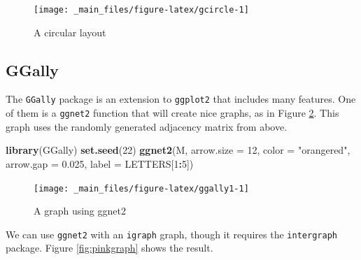 \documentclass[
]{book}
\newenvironment{Shaded}{\begin{snugshade}}{\end{snugshade}}
\newcommand{\AttributeTok}[1]{\textcolor[rgb]{0.13,0.29,0.53}{#1}}
\newcommand{\DecValTok}[1]{\textcolor[rgb]{0.00,0.00,0.81}{#1}}
\newcommand{\FloatTok}[1]{\textcolor[rgb]{0.00,0.00,0.81}{#1}}
\newcommand{\FunctionTok}[1]{\textcolor[rgb]{0.13,0.29,0.53}{\textbf{#1}}}
\newcommand{\NormalTok}[1]{#1}
\newcommand{\SpecialCharTok}[1]{\textcolor[rgb]{0.81,0.36,0.00}{\textbf{#1}}}
\newcommand{\StringTok}[1]{\textcolor[rgb]{0.31,0.60,0.02}{#1}}
\theoremstyle{definition}
\theoremstyle{definition}
\theoremstyle{definition}
\theoremstyle{definition}
\theoremstyle{remark}
\begin{document}
\begin{figure}

{\centering \texttt{[image: \_main\_files/figure-latex/gcircle-1]} 

}

\caption{A circular layout}\label{fig:gcircle}
\end{figure}

\subsection*{GGally}\label{ggally}

The \texttt{GGally} package is an extension to \texttt{ggplot2} that includes many features. One of them is a \texttt{ggnet2} function that will create nice graphs, as in Figure \ref{fig:ggally1}. This graph uses the randomly generated adjacency matrix from above.

\begin{Shaded}
\begin{Highlighting}[]
\FunctionTok{library}\NormalTok{(GGally)}
\FunctionTok{set.seed}\NormalTok{(}\DecValTok{22}\NormalTok{)}
\FunctionTok{ggnet2}\NormalTok{(M, }\AttributeTok{arrow.size =} \DecValTok{12}\NormalTok{,}
       \AttributeTok{color =} \StringTok{"orangered"}\NormalTok{,}
       \AttributeTok{arrow.gap =} \FloatTok{0.025}\NormalTok{, }
       \AttributeTok{label =}\NormalTok{ LETTERS[}\DecValTok{1}\SpecialCharTok{:}\DecValTok{5}\NormalTok{])}
\end{Highlighting}
\end{Shaded}

\begin{figure}

{\centering \texttt{[image: \_main\_files/figure-latex/ggally1-1]} 

}

\caption{A graph using ggnet2}\label{fig:ggally1}
\end{figure}

We can use \texttt{ggnet2} with an \texttt{igraph} graph, though it requires the \texttt{intergraph} package. Figure \ref{fig:pinkgraph} shows the result.

\begin{Shaded}
\end{Shaded}
\end{document}

